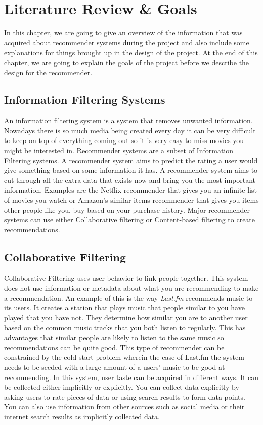 \chapter{Literature Review \& Goals} %


    In this chapter, we are going to give an overview of the information that was acquired about recommender systems during the project and also include some explanations for things brought up in the design of the project. At the end of this chapter, we are going to explain the goals of the project before we describe the design for the recommender.

    \section{Information Filtering Systems}

        An information filtering system is a system that removes unwanted information. Nowadays there is so much media being created every day it can be very difficult to keep on top of everything coming out so it is very easy to miss movies you might be interested in. Recommender systems are a subset of Information Filtering systems.  A recommender system aims to predict the rating a user would give something based on some information it has. A recommender system aims to cut through all the extra data that exists now and bring you the most important information. Examples are the Netflix recommender that gives you an infinite list of movies you watch or Amazon's similar items recommender that gives you items other people like you, buy based on your purchase history. Major recommender systems can use either Collaborative filtering or Content-based filtering to create recommendations. 


    \section{Collaborative Filtering}
        Collaborative Filtering uses user behavior to link people together. This system does not use information or metadata about what you are recommending to make a recommendation. An example of this is the way \textit{Last.fm} recommends music to its users. It creates a station that plays music that people similar to you have played that you have not. They determine how similar you are to another user based on the common music tracks that you both listen to regularly. This has advantages that similar people are likely to listen to the same music so recommendations can be quite good. This type of recommender can be constrained by the cold start problem wherein the case of Last.fm the system needs to be seeded with a large amount of a users' music to be good at recommending. In this system, user taste can be acquired in different ways. It can be collected either implicitly or explicitly. You can collect data explicitly by asking users to rate pieces of data or using search results to form data points. You can also use information from other sources such as social media or their internet search results as implicitly collected data.


